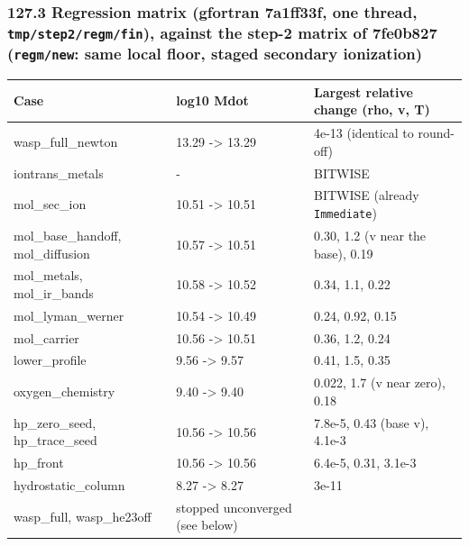 \documentclass[english,a4paper]{my_memo}
\begin{document}
\subsubsection{\texorpdfstring{127.3 Regression matrix (gfortran 7a1ff33f, one thread, \texttt{tmp/step2/regm/fin}), against the step-2 matrix of 7fe0b827 (\texttt{regm/new}: same local floor, staged secondary ionization)}{127.3 Regression matrix (gfortran 7a1ff33f, one thread, tmp/step2/regm/fin), against the step-2 matrix of 7fe0b827 (regm/new: same local floor, staged secondary ionization)}}\label{1273-regression-matrix-gfortran-7a1ff33f-one-thread-tmpstep2regmfin-against-the-step-2-matrix-of-7fe0b827-regmnew-same-local-floor-staged-secondary-ionization}

{\def\LTcaptype{none} %
{\small
\begin{longtable}[]{@{}lll@{}}
\toprule\noalign{}
Case & log10 Mdot & Largest relative change (rho, v, T) \\
\midrule\noalign{}
\endhead
\bottomrule\noalign{}
\endlastfoot
wasp\_full\_newton & 13.29 -\textgreater{} 13.29 & 4e-13 (identical to round-off) \\
iontrans\_metals & - & BITWISE \\
mol\_sec\_ion & 10.51 -\textgreater{} 10.51 & BITWISE (already \texttt{Immediate}) \\
mol\_base\_handoff, mol\_diffusion & 10.57 -\textgreater{} 10.51 & 0.30, 1.2 (v near the base), 0.19 \\
mol\_metals, mol\_ir\_bands & 10.58 -\textgreater{} 10.52 & 0.34, 1.1, 0.22 \\
mol\_lyman\_werner & 10.54 -\textgreater{} 10.49 & 0.24, 0.92, 0.15 \\
mol\_carrier & 10.56 -\textgreater{} 10.51 & 0.36, 1.2, 0.24 \\
lower\_profile & 9.56 -\textgreater{} 9.57 & 0.41, 1.5, 0.35 \\
oxygen\_chemistry & 9.40 -\textgreater{} 9.40 & 0.022, 1.7 (v near zero), 0.18 \\
hp\_zero\_seed, hp\_trace\_seed & 10.56 -\textgreater{} 10.56 & 7.8e-5, 0.43 (base v), 4.1e-3 \\
hp\_front & 10.56 -\textgreater{} 10.56 & 6.4e-5, 0.31, 3.1e-3 \\
hydrostatic\_column & 8.27 -\textgreater{} 8.27 & 3e-11 \\
wasp\_full, wasp\_he23off & stopped unconverged (see below) & \\
\end{longtable}
}
}
\end{document}
